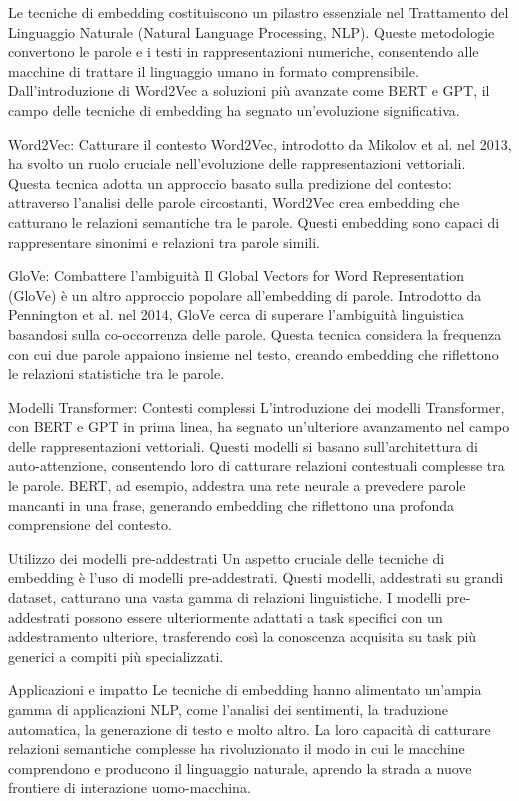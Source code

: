 Le tecniche di embedding costituiscono un pilastro essenziale nel Trattamento del Linguaggio Naturale (Natural Language Processing, NLP). Queste metodologie convertono le parole e i testi in rappresentazioni numeriche, consentendo alle macchine di trattare il linguaggio umano in formato comprensibile. Dall'introduzione di Word2Vec a soluzioni più avanzate come BERT e GPT, il campo delle tecniche di embedding ha segnato un'evoluzione significativa.

Word2Vec: Catturare il contesto
Word2Vec, introdotto da Mikolov et al. nel 2013, ha svolto un ruolo cruciale nell'evoluzione delle rappresentazioni vettoriali. Questa tecnica adotta un approccio basato sulla predizione del contesto: attraverso l'analisi delle parole circostanti, Word2Vec crea embedding che catturano le relazioni semantiche tra le parole. Questi embedding sono capaci di rappresentare sinonimi e relazioni tra parole simili.

GloVe: Combattere l'ambiguità
Il Global Vectors for Word Representation (GloVe) è un altro approccio popolare all'embedding di parole. Introdotto da Pennington et al. nel 2014, GloVe cerca di superare l'ambiguità linguistica basandosi sulla co-occorrenza delle parole. Questa tecnica considera la frequenza con cui due parole appaiono insieme nel testo, creando embedding che riflettono le relazioni statistiche tra le parole.

Modelli Transformer: Contesti complessi
L'introduzione dei modelli Transformer, con BERT e GPT in prima linea, ha segnato un'ulteriore avanzamento nel campo delle rappresentazioni vettoriali. Questi modelli si basano sull'architettura di auto-attenzione, consentendo loro di catturare relazioni contestuali complesse tra le parole. BERT, ad esempio, addestra una rete neurale a prevedere parole mancanti in una frase, generando embedding che riflettono una profonda comprensione del contesto.

Utilizzo dei modelli pre-addestrati
Un aspetto cruciale delle tecniche di embedding è l'uso di modelli pre-addestrati. Questi modelli, addestrati su grandi dataset, catturano una vasta gamma di relazioni linguistiche. I modelli pre-addestrati possono essere ulteriormente adattati a task specifici con un addestramento ulteriore, trasferendo così la conoscenza acquisita su task più generici a compiti più specializzati.

Applicazioni e impatto
Le tecniche di embedding hanno alimentato un'ampia gamma di applicazioni NLP, come l'analisi dei sentimenti, la traduzione automatica, la generazione di testo e molto altro. La loro capacità di catturare relazioni semantiche complesse ha rivoluzionato il modo in cui le macchine comprendono e producono il linguaggio naturale, aprendo la strada a nuove frontiere di interazione uomo-macchina.